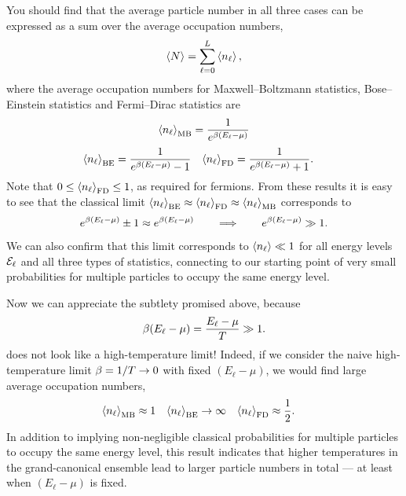 You should find that the average particle number in all three cases can be expressed as a sum over the average occupation numbers,
\begin{equation*}
  \left\langle N \right\rangle = \sum_{\ell = 0}^L \left\langle n_{\ell} \right\rangle,
\end{equation*}
where the average occupation numbers for Maxwell--Boltzmann statistics, Bose--Einstein statistics and Fermi--Dirac statistics are
\begin{equation*}
  \left\langle n_{\ell} \right\rangle_{\text{MB}} = \frac{1}{e^{\beta (E_{\ell} - \mu)}}
\end{equation*}
\begin{align*}
  \left\langle n_{\ell} \right\rangle_{\text{BE}} & = \frac{1}{e^{\beta (E_{\ell} - \mu)} - 1} &
  \left\langle n_{\ell} \right\rangle_{\text{FD}} & = \frac{1}{e^{\beta (E_{\ell} - \mu)} + 1}.
\end{align*}
Note that $0 \leq \left\langle n_{\ell} \right\rangle_{\text{FD}} \leq 1$, as required for fermions.
From these results it is easy to see that the classical limit $\left\langle n_{\ell} \right\rangle_{\text{BE}} \approx \left\langle n_{\ell} \right\rangle_{\text{FD}} \approx \left\langle n_{\ell} \right\rangle_{\text{MB}}$ corresponds to
\begin{equation*}
  e^{\beta (E_{\ell} - \mu)} \pm 1 \approx e^{\beta (E_{\ell} - \mu)} \qquad \Longrightarrow \qquad e^{\beta (E_{\ell} - \mu)} \gg 1.
\end{equation*}
We can also confirm that this limit corresponds to $\left\langle n_{\ell} \right\rangle \ll 1$ for all energy levels $\mathcal E_{\ell}$ and all three types of statistics, connecting to our starting point of very small probabilities for multiple particles to occupy the same energy level.

Now we can appreciate the subtlety promised above, because
\begin{equation}
  \label{eq:highT_ratio}
  \beta (E_{\ell} - \mu) = \frac{E_{\ell} - \mu}{T} \gg 1.
\end{equation}
does not look like a high-temperature limit!
Indeed, if we consider the naive high-temperature limit $\beta = 1 / T \to 0$ with fixed $(E_{\ell} - \mu)$, we would find large average occupation numbers,
\begin{align*}
  \left\langle n_{\ell} \right\rangle_{\text{MB}} & \approx 1 &
  \left\langle n_{\ell} \right\rangle_{\text{BE}} & \to \infty & 
  \left\langle n_{\ell} \right\rangle_{\text{FD}} & \approx \frac{1}{2}.
\end{align*}
In addition to implying non-negligible classical probabilities for multiple particles to occupy the same energy level, this result indicates that higher temperatures in the grand-canonical ensemble lead to larger particle numbers in total --- at least when $(E_{\ell} - \mu)$ is fixed.

